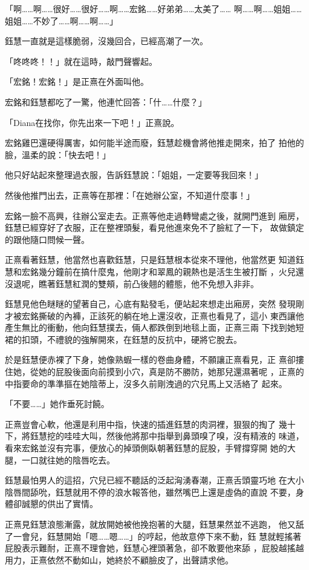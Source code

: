 「啊……啊……很好……很好……啊……宏銘……好弟弟……太美了……
啊……啊……姐姐……姐姐……不妙了……啊……啊……」

鈺慧一直就是這樣脆弱，沒幾回合，已經高潮了一次。

「咚咚咚！！」就在這時，敲門聲響起。

「宏銘！宏銘！」是正熹在外面叫他。

宏銘和鈺慧都吃了一驚，他連忙回答：「什……什麼？」

「Diana在找你，你先出來一下吧！」正熹說。

宏銘雞巴還硬得厲害，如何能半途而廢，鈺慧趁機會將他推走開來，拍了
拍他的臉，溫柔的說：「快去吧！」

他只好站起來整理過衣服，告訴鈺慧說：「姐姐，一定要等我回來！」

然後他推門出去，正熹等在那裡：「在她辦公室，不知道什麼事！」

宏銘一臉不高興，往辦公室走去。正熹等他走過轉彎處之後，就開門進到
廂房，鈺慧已經穿好了衣服，正在整裡頭髮，看見他進來免不了臉紅了一下，
故做鎮定的跟他隨口問候一聲。

正熹看著鈺慧，他當然也喜歡鈺慧，只是鈺慧根本從來不理他，他當然更
知道鈺慧和宏銘幾分鐘前在搞什麼鬼，他剛才和翠鳳的親熱也是活生生被打斷
，火兒還沒退呢，瞧著鈺慧紅潤的雙頰，前凸後翹的體態，他不免想入非非。

鈺慧見他色瞇瞇的望著自己，心底有點發毛，便站起來想走出廂房，突然
發現剛才被宏銘撕破的內褲，正該死的躺在地上還沒收，正熹也看見了，這小
東西讓他產生無比的衝動，他向鈺慧撲去，倆人都跌倒到地毯上面，正熹三兩
下找到她短裙的扣頭，不禮貌的強解開來，在鈺慧的反抗中，硬將它脫去。

於是鈺慧便赤裸了下身，她像熟蝦一樣的卷曲身體，不願讓正熹看見，正
熹卻摟住她，從她的屁股後面向前摸到小穴，真是防不勝防，她那兒還濕著呢
，正熹的中指要命的準準摳在她陰蒂上，沒多久前剛洩過的穴兒馬上又活絡了
起來。

「不要……」她作垂死討饒。

正熹豈會心軟，他還是利用中指，快速的插進鈺慧的肉洞裡，狠狠的掏了
幾十下，將鈺慧挖的哇哇大叫，然後他將那中指舉到鼻頭嗅了嗅，沒有精液的
味道，看來宏銘並沒有完事，便放心的掉頭側臥朝著鈺慧的屁股，手臂撐穿開
她的大腿，一口就往她的陰唇吃去。

鈺慧最怕男人的這招，穴兒已經不聽話的泛起洶湧春潮，正熹舌頭靈巧地
在大小陰唇間舔吮，鈺慧就用不停的浪水報答他，雖然嘴巴上還是虛偽的直說
不要，身體卻誠懇的供出了實情。

正熹見鈺慧浪態漸露，就放開她被他挽抱著的大腿，鈺慧果然並不逃跑，
他又舐了一會兒，鈺慧開始「嗯……嗯……」的哼起，他故意停下來不動，鈺
慧就輕搖著屁股表示難耐，正熹不理會她，鈺慧心裡頭著急，卻不敢要他來舔
，屁股越搖越用力，正熹依然不動如山，她終於不顧臉皮了，出聲請求他。


